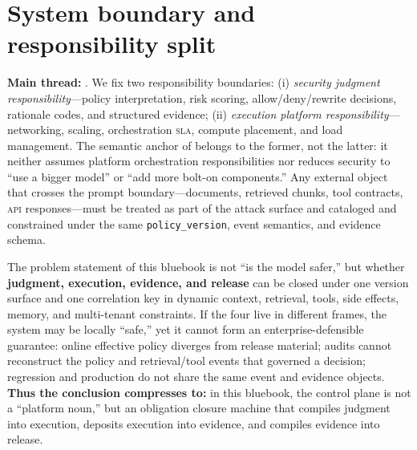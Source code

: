 \documentclass[11pt,a4paper]{report}
\begin{document}
\section{System boundary and responsibility split}
\textbf{Main thread:} \ControlPlane{}. We fix two responsibility boundaries: (i) \emph{security judgment responsibility}—policy interpretation, risk scoring, allow/deny/rewrite decisions, rationale codes, and structured evidence; (ii) \emph{execution platform responsibility}—networking, scaling, orchestration \textsc{sla}, compute placement, and load management. The semantic anchor of \ControlPlane{} belongs to the former, not the latter: it neither assumes platform orchestration responsibilities nor reduces security to “use a bigger model” or “add more bolt-on components.” Any external object that crosses the prompt boundary—documents, retrieved chunks, tool contracts, \textsc{api} responses—must be treated as part of the attack surface and cataloged and constrained under the same \texttt{policy\_version}, event semantics, and evidence schema.

\begin{problemstatement}
The problem statement of this bluebook is not “is the model safer,” but whether \textbf{judgment, execution, evidence, and release} can be closed under one version surface and one correlation key in dynamic context, retrieval, tools, side effects, memory, and multi-tenant constraints. If the four live in different frames, the system may be locally “safe,” yet it cannot form an enterprise-defensible guarantee: online effective policy diverges from release material; audits cannot reconstruct the policy and retrieval/tool events that governed a decision; regression and production do not share the same event and evidence objects. \textbf{Thus the conclusion compresses to:} in this bluebook, the control plane is not a “platform noun,” but an obligation closure machine that compiles judgment into execution, deposits execution into evidence, and compiles evidence into release.
\end{problemstatement}
\end{document}
